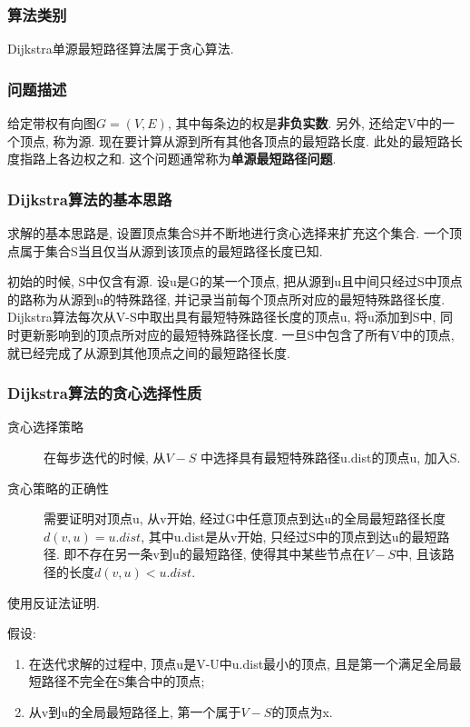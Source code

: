 \subsubsection{算法类别}
Dijkstra单源最短路径算法属于贪心算法.

\subsubsection{问题描述}
给定带权有向图$G=(V,E)$, 其中每条边的权是\textbf{非负实数}. 另外, 还给定V中的一个顶点,
称为源. 现在要计算从源到所有其他各顶点的最短路长度.
此处的最短路长度指路上各边权之和. 这个问题通常称为\textbf{单源最短路径问题}.

\subsubsection{Dijkstra算法的基本思路}
求解的基本思路是, 设置顶点集合S并不断地进行贪心选择来扩充这个集合.
一个顶点属于集合S当且仅当从源到该顶点的最短路径长度已知.\par

初始的时候, S中仅含有源. 设u是G的某一个顶点,
把从源到u且中间只经过S中顶点的路称为从源到u的特殊路径,
并记录当前每个顶点所对应的最短特殊路径长度.
Dijkstra算法每次从V-S中取出具有最短特殊路径长度的顶点u, 将u添加到S中,
同时更新影响到的顶点所对应的最短特殊路径长度. 一旦S中包含了所有V中的顶点,
就已经完成了从源到其他顶点之间的最短路径长度.

\subsubsection{Dijkstra算法的贪心选择性质}
\begin{description}
	\item[贪心选择策略] 在每步迭代的时候, 从$V-S$
		中选择具有最短特殊路径u.dist的顶点u, 加入S.
	\item[贪心策略的正确性] 需要证明对顶点u, 从v开始,
		经过G中任意顶点到达u的全局最短路径长度$d(v, u) = u.dist$,
		其中u.dist是从v开始, 只经过S中的顶点到达u的最短路径.
		即不存在另一条v到u的最短路径, 使得其中某些节点在$V-S$中,
		且该路径的长度$d(v, u)< u.dist$.
\end{description}

使用反证法证明.\par

假设:
\begin{enumerate}
	\item 在迭代求解的过程中, 顶点u是V-U中u.dist最小的顶点,
	      且是第一个满足全局最短路径不完全在S集合中的顶点;
	\item 从v到u的全局最短路径上, 第一个属于$V-S$的顶点为x.
\end{enumerate}

